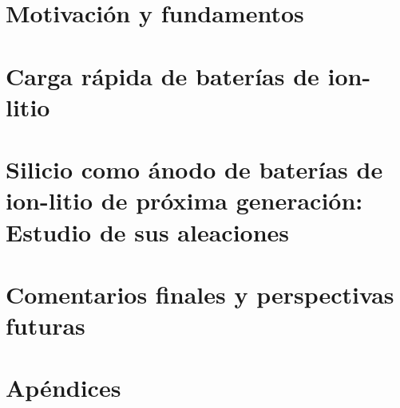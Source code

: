 \documentclass[12pt, spanish, a4paper, twoside]{book}
\begin{document}
\frontmatter








\tableofcontents

\mainmatter


\part{Motivación y fundamentos}






\part{Carga rápida de baterías de ion-litio}\label{p:fast-charging}






\part{Silicio como ánodo de baterías de ion-litio de próxima generación: Estudio de sus aleaciones}\label{p:silicio}








\part{Comentarios finales y perspectivas futuras}




\part{Apéndices}

\appendix
\renewcommand\chaptername{Apéndice}





\end{document}
